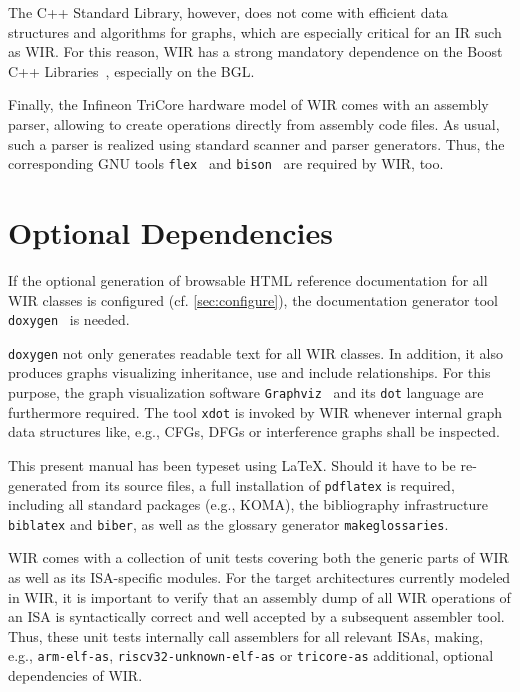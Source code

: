The C++ Standard Library, however, does not come with efficient data structures and algorithms for graphs, which are especially critical for an \gls{IR} such as \gls{WIR}.
For this reason, \gls{WIR} has a strong mandatory dependence on the Boost C++ Libraries~\cite{boost26}, especially on the \gls{BGL}.

Finally, the Infineon TriCore hardware model of \gls{WIR} comes with an assembly parser, allowing to create operations directly from assembly code files.
As usual, such a parser is realized using standard scanner and parser generators.
Thus, the corresponding GNU tools \texttt{flex}~\cite{gnuflex26} and \texttt{bison}~\cite{gnubison26} are required by \gls{WIR}, too.


\section{Optional Dependencies}
\label{sec:optional}

If the optional generation of browsable HTML reference documentation for all \gls{WIR} classes is configured (cf. \cref{sec:configure}), the documentation generator tool \texttt{doxygen}~\cite{doxygen26} is needed.

\texttt{doxygen} not only generates readable text for all \gls{WIR} classes.
In addition, it also produces graphs visualizing inheritance, use and include relationships.
For this purpose, the graph visualization software \texttt{Graphviz}~\cite{graphviz26} and its \texttt{dot} language are furthermore required.
The tool \texttt{xdot} is invoked by \gls{WIR} whenever internal graph data structures like, e.g., \glspl{CFG}, \glspl{DFG} or interference graphs shall be inspected.

This present manual has been typeset using \LaTeX.
Should it have to be re-generated from its source files, a full installation of \texttt{pdflatex} is required, including all standard packages (e.g., KOMA), the bibliography infrastructure \texttt{biblatex} and \texttt{biber}, as well as the glossary generator \texttt{makeglossaries}.

\gls{WIR} comes with a collection of unit tests covering both the generic parts of \gls{WIR} as well as its \gls{ISA}-specific modules.
For the target architectures currently modeled in \gls{WIR}, it is important to verify that an assembly dump of all \gls{WIR} operations of an \gls{ISA} is syntactically correct and well accepted by a subsequent assembler tool.
Thus, these unit tests internally call assemblers for all relevant \glspl{ISA}, making, e.g., \texttt{arm-elf-as}, \texttt{riscv32-unknown-elf-as} or \texttt{tricore-as} additional, optional dependencies of \gls{WIR}.

\cleardoubleoddpage
